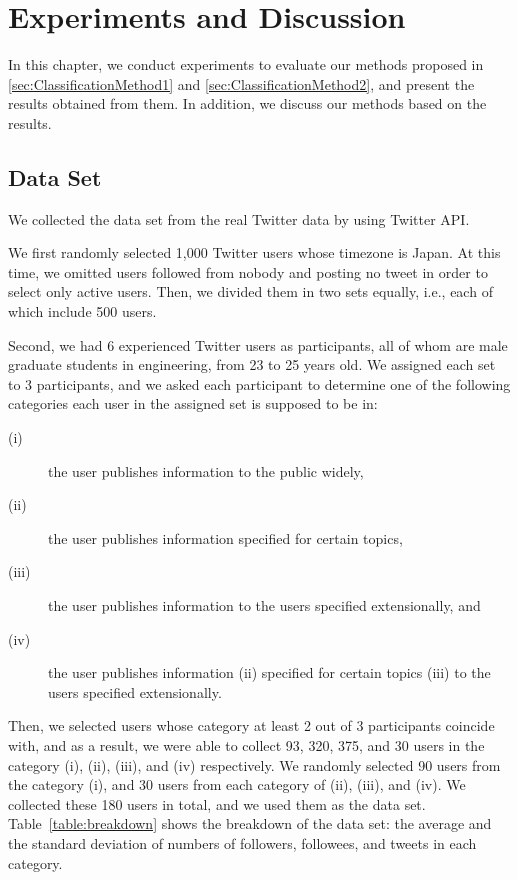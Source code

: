 \section{Experiments and Discussion}
\label{sec:Experiment}

In this chapter, we conduct experiments to evaluate our methods proposed
in \ref{sec:ClassificationMethod1} and \ref{sec:ClassificationMethod2},
and present the results obtained from them.  In addition, we discuss our
methods based on the results.

\subsection{Data Set}
\label{subsec:Data Set}

We collected the data set from the real Twitter data by using Twitter
API.

We first randomly selected 1,000 Twitter users whose timezone is Japan.
At this time, we omitted users followed from nobody and posting
no tweet in order to select only active users.  Then, we divided them in
two sets equally, i.e., each of which include 500 users.

Second, we had 6 experienced Twitter users as participants, all of whom
are male graduate students in engineering, from 23 to 25 years old.  We
assigned each set to 3 participants, and we asked each participant to
determine one of the following categories each user in the assigned set
is supposed to be in:

\begin{description}
\item[(i)] the user publishes information to the public widely,
\item[(ii)] the user publishes information specified for certain topics,
\item[(iii)] the user publishes information to the users specified
           extensionally, and
\item[(iv)] the user publishes information (ii) specified for certain
           topics (iii) to the users specified extensionally.
\end{description}


Then, we selected users whose category at least 2 out of 3 participants
coincide with, and as a result, we were able to collect 93, 320, 375,
and 30 users in the category (i), (ii), (iii), and (iv) respectively.  We randomly
selected 90 users from the category (i), and 30 users from each category
of (ii), (iii), and (iv).  We collected these 180 users in total, and we
used them as the data set.  Table~\ref{table:breakdown} shows the
breakdown of the data set: the average and the standard deviation of numbers of
followers, followees, and tweets in each category.

